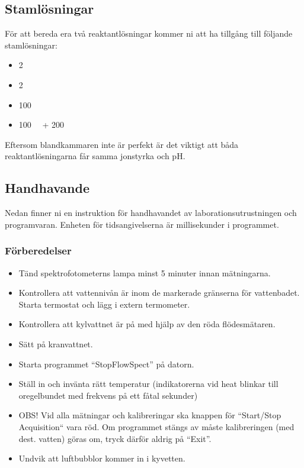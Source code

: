 \subsection{Stamlösningar}
För att bereda era två reaktantlösningar kommer ni att ha tillgång till följande
stamlösningar:

\begin{itemize}
\item \SI{2}{\Molar} 
\item \SI{2}{\Molar} 
\item \SI{100}{\milli\Molar} 
\item \SI{100}{\milli\Molar}  + \SI{200}{\milli\Molar} 
\end{itemize}

Eftersom blandkammaren inte är perfekt är det viktigt att båda
reaktantlösningarna får samma jonstyrka och pH.

\subsection{Handhavande}
\label{sec:handhavande}
Nedan finner ni en instruktion för handhavandet av
laborationsutrustningen och programvaran. Enheten för tidsangivelserna är
millisekunder i programmet.

\subsubsection{Förberedelser}
\begin{itemize}
\item Tänd spektrofotometerns lampa minst 5 minuter innan mätningarna.
\item Kontrollera att vattennivån är inom de markerade gränserna för vattenbadet.
Starta termostat och lägg i extern termometer.
\item Kontrollera att kylvattnet är på med hjälp av den röda flödesmätaren.
\item Sätt på kranvattnet.
\item Starta programmet ``StopFlowSpect'' på datorn.
\item Ställ in och invänta rätt temperatur (indikatorerna vid heat
  blinkar till oregelbundet med frekvens på ett fåtal sekunder)
\item OBS! Vid alla mätningar och
  kalibreringar ska knappen för ``Start/Stop Acquisition`` vara röd. Om
  programmet stängs av måste kalibreringen (med dest. vatten) göras om,
  tryck därför aldrig på ``Exit''.
\item Undvik att luftbubblor kommer in i kyvetten.
\end{itemize}
